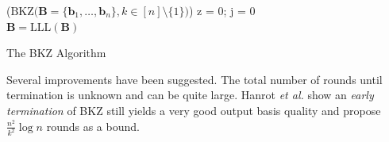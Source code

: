 \begin{algorithm2e} %
  \Begin($\text{BKZ} {(} \mathbf{B} = \{\mathbf{b}_1, \dots, \mathbf{b}_{n}\}, k \in [n]\setminus \{1\} {)}$) %
  {
      z = 0; j = 0\\
      $\mathbf{B} = \text{LLL}(\mathbf{B})$ \\%
    }
  \caption[The BKZ Algorithm]{The BKZ Algorithm \cite{SE91}} \label{alg:BKZ}
\end{algorithm2e} %


Several improvements have been suggested. The total number of rounds until termination is unknown and can be quite large. Hanrot \textit{et al.} \cite{HPS11a} show an \textit{early termination} of BKZ still yields a very good output basis quality and propose $\frac{n^2}{k^2} \log n$ rounds as a bound.

